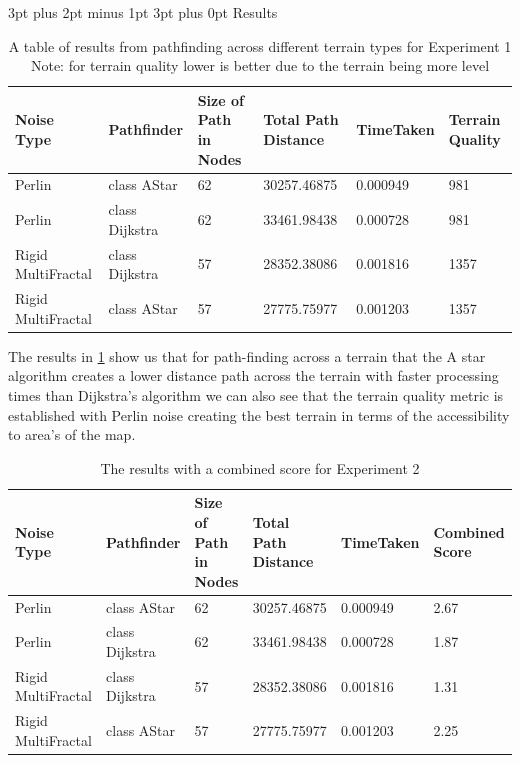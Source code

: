 \documentclass[12pt,a4paper]{article}
\makeatletter
\renewcommand\subsection{\@startsection {subsection}{1}{2mm} %
                               {3pt plus 2pt minus 1pt} %
                               {3pt plus 0pt} %
                               {\normalfont\bfseries}}
\makeatother
\begin{document}
\subsection{Results}
\label{Results}
\begin{table}[h!]
\begin{tabular}{|p{2.7cm}|p{2cm}|p{2.5cm}|p{2.2cm}|p{2.2cm}|p{1.4cm}|}
	\hline
Noise Type&	Pathfinder&	Size of Path in Nodes	& Total Path Distance	& TimeTaken	& Terrain Quality\\
\hline
Perlin&	class AStar&	62	& 30257.46875	& 0.000949	& 981\\
\hline
Perlin&	class Dijkstra&	62&	33461.98438&	0.000728&	981\\
\hline
Rigid  MultiFractal&	class Dijkstra&	57&	28352.38086&	0.001816&	1357\\
\hline
Rigid MultiFractal&	class AStar&	57&	27775.75977&	0.001203&	1357\\
\hline
\end{tabular}
\caption{A table of results from pathfinding across different terrain types for Experiment 1 \\Note: for terrain quality lower is better due to the terrain being more level}
	\label{Experiment1}
\end{table}

The results in \ref{Experiment1} show us that for path-finding across a terrain that the A star algorithm creates a lower distance path across the terrain with faster processing times than Dijkstra's algorithm we can also see that the terrain quality metric is established with Perlin noise creating the best terrain in terms of the accessibility to area's of the map.  

\begin{table}[h!]
	\begin{tabular}{|p{2.7cm}|p{2cm}|p{2.5cm}|p{2.2cm}|p{2.2cm}|p{1.6cm}|}
		\hline
		Noise Type&	Pathfinder&	Size of Path in Nodes	& Total Path Distance	& TimeTaken	&  Combined Score\\
		\hline
		Perlin&	class AStar&	62	& 30257.46875	& 0.000949	& 2.67\\
		\hline
		Perlin&	class Dijkstra&	62&	33461.98438&	0.000728& 1.87	\\
		\hline
		Rigid  MultiFractal&	class Dijkstra&	57&	28352.38086&	0.001816& 1.31\\
		\hline
		Rigid MultiFractal&	class AStar&	57&	27775.75977&	0.001203&	2.25\\
		\hline
	\end{tabular}
	\caption{The results with a combined score for Experiment 2}
	\label{Experiment 2}
\end{table}
\end{document}

